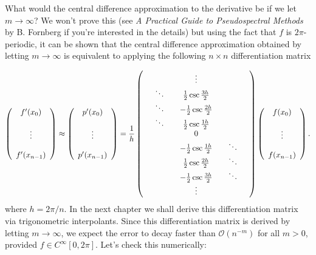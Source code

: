 \documentclass[12pt,a4paper]{article}
\begin{document}
What would the central difference approximation to the derivative be if we let $m \to \infty$? We won't prove this (see \emph{A Practical Guide to Pseudospectral Methods} by B. Fornberg if you're interested in the details) but using the fact that $f$ is $2\pi$-periodic, it can be shown that the central difference approximation obtained by letting $m \to \infty$ is equivalent to applying the following $n \times n$ differentiation matrix

\[
\left(
\begin{array}{c}
f'(x_0) \\
  \\
\vdots  \\
  \\
f'(x_{n-1})
\end{array}
\right) \approx 
\left(
\begin{array}{c}
p'(x_0) \\
  \\
\vdots  \\
  \\
p'(x_{n-1})
\end{array}
\right) = \frac{1}{h}
\left(
\begin{array}{c c c c c c c}
  &       &       & \vdots  &   &   & \\
  &\ddots &       & \frac{1}{2}\csc \frac{3h}{2}   &   &    &  \\
   &\ddots &      &-\frac{1}{2}\csc \frac{2h}{2}   &   &    &  \\ 
   &\ddots &      & \frac{1}{2}\csc \frac{1h}{2}   &   &    &   \\
  &        &      & 0                              &   &    &   \\
&      &      & -\frac{1}{2}\csc \frac{1h}{2}   &   &   \ddots &  \\
&      &      & \frac{1}{2}\csc \frac{2h}{2}   &   &   \ddots &  \\
&      &      & -\frac{1}{2}\csc \frac{3h}{2}   &   &   \ddots &  \\
&      &      & \ensuremath{\vdots}  &   &    &  
\end{array}
\right)
\left(
\begin{array}{c}
f(x_0) \\
  \\
\vdots  \\
  \\
f(x_{n-1})
\end{array}
\right).
\]
where $h = 2\pi/n$.  In the next chapter we shall derive this differentiation matrix via trigonometric interpolants.   Since this differentiation matrix is derived by letting $m \to \infty$, we expect the error to decay faster than $\mathcal{O}(n^{-m})$ for all $m > 0$, provided $f \in C^{\infty}[0, 2\pi]$.  Let's check this numerically:
\end{document}
